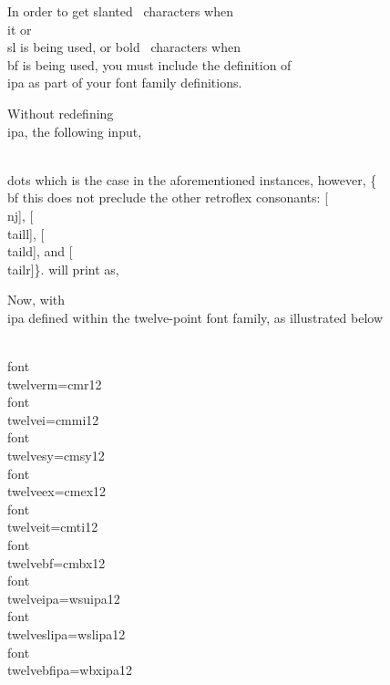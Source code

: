 In order to get slanted \wsu\ characters when \\it or \\sl is being used, or
bold \wsu\ characters when \\bf is being used, you must include the definition
of \\ipa as part of your font family definitions.
 
Without redefining \\ipa, the following input,
 
\aib\lin{0pt}
\\dots which is the case in the aforementioned
instances, however, \{\\bf this
does not preclude the other retroflex consonants:
[\\nj], [\\taill], [\\taild], and [\\tailr]\}.
\aie
\nin will print as,
 
\vs{5pt}
\vs{5pt}
 
Now, with \\ipa defined within the twelve-point font family, as illustrated
below
 
\aib\lin{-10pt}
\\font\\twelverm=cmr12
\\font\\twelvei=cmmi12
\\font\\twelvesy=cmsy12
\\font\\twelveex=cmex12
\\font\\twelveit=cmti12
\\font\\twelvebf=cmbx12
\\font\\twelveipa=wsuipa12
\\font\\twelveslipa=wslipa12
\\font\\twelvebfipa=wbxipa12
 
